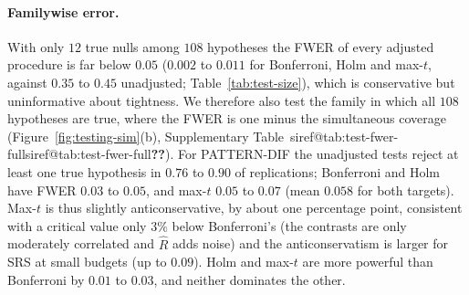 \documentclass[pdflatex,sn-mathphys-num,iicol]{sn-jnl}
\makeatletter
\theoremstyle{thmstyleone}
\theoremstyle{thmstyletwo}
\theoremstyle{thmstylethree}
\newcommand{\SIref}[1]{\ifcsname siref@#1\endcsname\csname siref@#1\endcsname\else\textbf{??}\fi}
\makeatother
\begin{document}
\begin{table}[t]
\centering\footnotesize
\caption{PATTERN-DIF, synthetic population, $R=1000$ pools per row. Size: rejection rate of the two-sided Wald test of the true value at nominal $0.05$ (pool-conditional test of the pool contrast; two-phase test of the population contrast), mean and maximum over the $108$ contrasts (the maximum of a calibrated test has mean $0.068$). $\varpi$: median estimated $V_{\rm pool}/V_{\rm design}$. FWER: probability of rejecting at least one of the $12$ true nulls of $H_k:\theta_k=0$, $k=1,\dots,108$, at familywise level $0.05$ (population target).}\label{tab:test-size}
\end{table}

\paragraph{Familywise error.} With only $12$ true nulls among $108$ hypotheses the FWER of every adjusted procedure is far below $0.05$ ($0.002$ to $0.011$ for Bonferroni, Holm and max-$t$, against $0.35$ to $0.45$ unadjusted; Table~\ref{tab:test-size}), which is conservative but uninformative about tightness. We therefore also test the family in which all $108$ hypotheses are true, where the FWER is one minus the simultaneous coverage (Figure~\ref{fig:testing-sim}(b), Supplementary Table~\SIref{tab:test-fwer-full}). For PATTERN-DIF the unadjusted tests reject at least one true hypothesis in $0.76$ to $0.90$ of replications; Bonferroni and Holm have FWER $0.03$ to $0.05$, and max-$t$ $0.05$ to $0.07$ (mean $0.058$ for both targets). Max-$t$ is thus slightly anticonservative, by about one percentage point, consistent with a critical value only $3\%$ below Bonferroni's (the contrasts are only moderately correlated and $\hat R$ adds noise) and the anticonservatism is larger for SRS at small budgets (up to $0.09$). Holm and max-$t$ are more powerful than Bonferroni by $0.01$ to $0.03$, and neither dominates the other.
\end{document}
